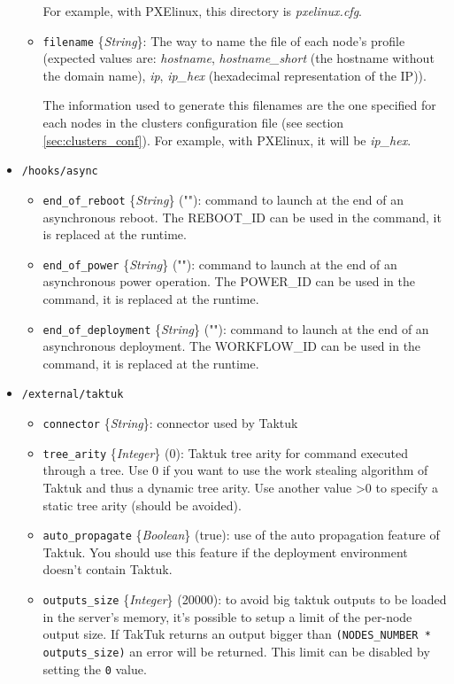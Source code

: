 \documentclass[a4wide,10pt,oneside]{book}
\newcommand{\ypath}[1]{\texttt{#1}}
\newcommand{\yfield}[2]{\texttt{#1} {\small\{{\emph{#2}}\}}:}
\newcommand{\yfieldd}[3]{\texttt{#1} {\small\{{\emph{#2}}\}} {\small(}#3{\small)}:}
\begin{document}
\begin{itemize}
\begin{itemize}
For example, with PXElinux, this directory is \emph{pxelinux.cfg}.
    \item \yfield{filename}{String} The way to name the file of each node's profile (expected values are: \emph{hostname}, \emph{hostname\_short} (the hostname without the domain name), \emph{ip}, \emph{ip\_hex} (hexadecimal representation of the IP)).

The information used to generate this filenames are the one specified for each nodes in the clusters configuration file (see section \ref{sec:clusters_conf}). For example, with PXElinux, it will be \emph{ip\_hex}.
  \end{itemize}

  \item \ypath{/hooks/async}
  \begin{itemize}
    \item \yfieldd{end\_of\_reboot}{String}{""} command to launch at the end of an asynchronous reboot. The REBOOT\_ID can be used in the command, it is replaced at the runtime.
    \item \yfieldd{end\_of\_power}{String}{""} command to launch at the end of an asynchronous power operation. The POWER\_ID can be used in the command, it is replaced at the runtime.
    \item \yfieldd{end\_of\_deployment}{String}{""} command to launch at the end of an asynchronous deployment. The WORKFLOW\_ID can be used in the command, it is replaced at the runtime.
  \end{itemize}

  \item \ypath{/external/taktuk}
  \begin{itemize}
    \item \yfield{connector}{String} connector used by Taktuk
    \item \yfieldd{tree\_arity}{Integer}{0} Taktuk tree arity for command executed through a tree. Use 0 if you want to use the work stealing algorithm of Taktuk and thus a dynamic tree arity. Use another value >0 to specify a static tree arity (should be avoided).
    \item \yfieldd{auto\_propagate}{Boolean}{true} use of the auto propagation feature of Taktuk. You should use this feature if the deployment environment doesn't contain Taktuk.
    \item \yfieldd{outputs\_size}{Integer}{20000} to avoid big taktuk outputs to be loaded in the server's memory, it's possible to setup a limit of the per-node output size. If TakTuk returns an output bigger than \texttt{(NODES\_NUMBER * outputs\_size)} an error will be returned. This limit can be disabled by setting the \texttt{0} value.
  \end{itemize}


\end{itemize}
\end{document}

